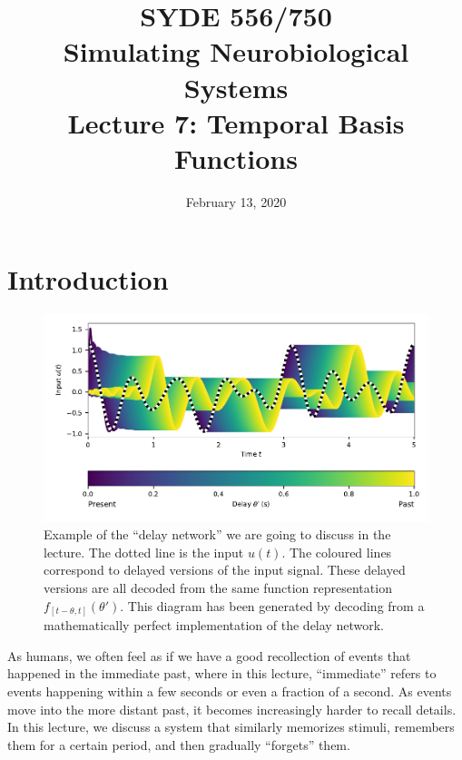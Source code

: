 \documentclass[10pt,letterpaper,oneside]{article}
\date{February 13, 2020}
\title{SYDE 556/750 \\ Simulating Neurobiological Systems \\ Lecture 7: Temporal Basis Functions}
\begin{document}

\section{Introduction}

\begin{figure}[h]
	\centering
	\includegraphics{media/delay_network_decoding.pdf}
	\caption{Example of the \enquote{delay network} we are going to discuss in the lecture. The dotted line is the input $u(t)$. The coloured lines correspond to delayed versions of the input signal. These delayed versions are all decoded from the same function representation $f_{[t - \theta, t]}(\theta')$. This diagram has been generated by decoding from a mathematically perfect implementation of the delay network. }
\end{figure}


As humans, we often feel as if we have a good recollection of events that happened in the immediate past, where in this lecture, \enquote{immediate} refers to events happening within a few seconds or even a fraction of a second. As events move into the more distant past, it becomes increasingly harder to recall details. In this lecture, we discuss a system that similarly memorizes stimuli, remembers them for a certain period, and then gradually \enquote{forgets} them.
\end{document}
